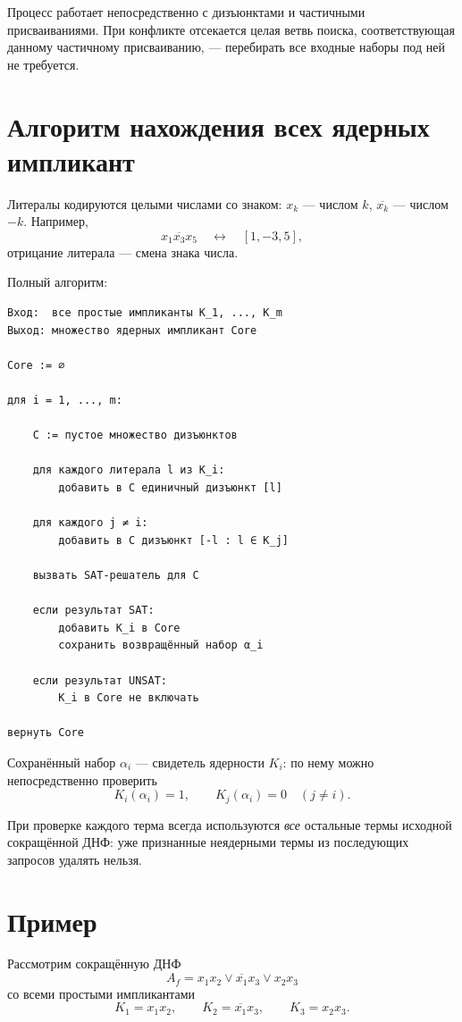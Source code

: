 \documentclass[11pt]{article}
\newcommand{\imp}[1]{\overline{#1}}
\begin{document}
Процесс работает непосредственно с дизъюнктами и частичными присваиваниями. При конфликте отсекается целая ветвь поиска, соответствующая данному частичному присваиванию, — перебирать все входные наборы под ней не требуется.

\section{Алгоритм нахождения всех ядерных импликант}

Литералы кодируются целыми числами со знаком: $x_k$ — числом $k$, $\imp{x_k}$ — числом $-k$. Например,
\[
x_1\imp{x_3}x_5 \quad\longleftrightarrow\quad [1,-3,5],
\]
отрицание литерала — смена знака числа.

Полный алгоритм:

\begin{Verbatim}[fontsize=\small,frame=single,framesep=6pt]
Вход:  все простые импликанты K_1, ..., K_m
Выход: множество ядерных импликант Core

Core := ∅

для i = 1, ..., m:

    C := пустое множество дизъюнктов

    для каждого литерала l из K_i:
        добавить в C единичный дизъюнкт [l]

    для каждого j ≠ i:
        добавить в C дизъюнкт [-l : l ∈ K_j]

    вызвать SAT-решатель для C

    если результат SAT:
        добавить K_i в Core
        сохранить возвращённый набор α_i

    если результат UNSAT:
        K_i в Core не включать

вернуть Core
\end{Verbatim}

Сохранённый набор $\alpha_i$ — свидетель ядерности $K_i$: по нему можно непосредственно проверить
\[
K_i(\alpha_i)=1,\qquad K_j(\alpha_i)=0\quad (j\ne i).
\]

При проверке каждого терма всегда используются \emph{все} остальные термы исходной сокращённой ДНФ: уже признанные неядерными термы из последующих запросов удалять нельзя.

\section{Пример}

Рассмотрим сокращённую ДНФ
\[
A_f = x_1x_2 \vee \imp{x_1}x_3 \vee x_2x_3
\]
со всеми простыми импликантами
\[
K_1=x_1x_2,\qquad K_2=\imp{x_1}x_3,\qquad K_3=x_2x_3.
\]
\end{document}
